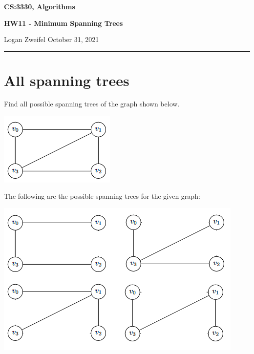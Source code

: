 \documentclass[11pt]{article}
\begin{document}
\thispagestyle{empty}

\begin{center}
\bf\large CS:3330, Algorithms
\end{center}

\begin{center}
\bf\large HW11 - Minimum Spanning Trees  %
\end{center}

\noindent
Logan Zweifel     %
\hfill
October 31, 2021           %

\noindent
\rule{\textwidth}{1pt}

\medskip


\section{All spanning trees} %
Find all possible spanning trees of the graph shown below. 

\begin{center}
\includegraphics{Q1template.png}
\end{center}

\bigskip
\bigskip

\noindent The following are the possible spanning trees for the given graph:

\begin{center}
\includegraphics{Q1A1.png}
\end{center}
\end{document}
